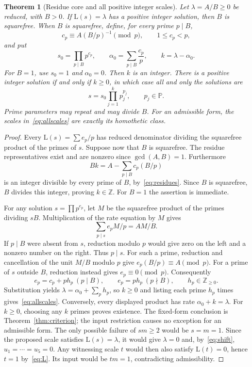 \documentclass[11pt,a4paper]{article}
\newcommand{\PP}{\mathbb{P}}
\newcommand{\Lrate}{\mathrm{L}}
\newtheorem{theorem}{Theorem}[section]
\theoremstyle{definition}
\theoremstyle{remark}
\begin{document}
\begin{theorem}[Residue core and all positive integer scales]\label{thm:residue}
Let $\lambda=A/B\ge0$ be reduced, with $B>0$. If $\Lrate(s)=\lambda$
has a positive integer solution, then $B$ is squarefree. When $B$ is
squarefree, define, for every prime $p\mid B$,
\begin{equation}\label{eq:residues}
 c_p\equiv A(B/p)^{-1}\pmod p,\qquad 1\le c_p<p,
\end{equation}
and put
\begin{equation}\label{eq:core}
 s_0=\prod_{p\mid B}p^{c_p},\qquad
 \alpha_0=\sum_{p\mid B}\frac{c_p}{p},\qquad
 k=\lambda-\alpha_0.
\end{equation}
For $B=1$, use $s_0=1$ and $\alpha_0=0$. Then $k$ is an integer.
There is a positive integer solution if and only if $k\ge0$, in which
case all and only the solutions are
\begin{equation}\label{eq:allscales}
 s=s_0\prod_{j=1}^{k}p_j^{p_j},\qquad p_j\in\PP.
\end{equation}
Prime parameters may repeat and may divide $B$. For an admissible form,
the scales in~\eqref{eq:allscales} are exactly its homothetic class.
\end{theorem}
\begin{proof}
Every $\Lrate(s)=\sum e_p/p$ has reduced denominator dividing the
squarefree product of the primes of $s$. Suppose now that $B$ is
squarefree. The residue representatives exist and are nonzero since
$\gcd(A,B)=1$. Furthermore
\[
 Bk=A-\sum_{p\mid B}c_p(B/p)
\]
is an integer divisible by every prime of $B$, by~\eqref{eq:residues}.
Since $B$ is squarefree, $B$ divides this integer, proving $k\in\mathbb Z$.
For $B=1$ the assertion is immediate.

For any solution $s=\prod p^{e_p}$, let $M$ be the squarefree product of
the primes dividing $sB$. Multiplication of the rate equation by $M$ gives
\begin{equation}\label{eq:modscale}
 \sum_{p\mid s}e_p M/p=A M/B.
\end{equation}
If $p\mid B$ were absent from $s$, reduction modulo $p$ would give zero
on the left and a nonzero number on the right. Thus $p\mid s$. For such
a prime, reduction and cancellation of the unit $M/B$ modulo $p$ give
$e_p(B/p)\equiv A\pmod p$. For a prime of $s$ outside $B$, reduction
instead gives $e_p\equiv0\pmod p$. Consequently
\[
 e_p=c_p+ph_p\ (p\mid B),\qquad
 e_p=ph_p\ (p\nmid B),\qquad h_p\in\mathbb Z_{\ge0}.
\]
Substitution yields $\lambda=\alpha_0+\sum_p h_p$, so $k\ge0$ and
listing each prime $h_p$ times gives~\eqref{eq:allscales}. Conversely,
every displayed product has rate $\alpha_0+k=\lambda$. For $k\ge0$,
choosing any $k$ primes proves existence. The fixed-form conclusion is
Theorem~\ref{thm:criterion}; the input restriction causes no exception for
an admissible form. The only possible failure of $sm\ge2$ would be $s=m=1$.
Since the proposed scale satisfies $\Lrate(s)=\lambda$, it would give
$\lambda=0$ and, by~\eqref{eq:shift}, $u_1=\cdots=u_5=0$.
Any witnessing scale $t$ would then also satisfy $\Lrate(t)=0$, hence
$t=1$ by~\eqref{eq:L}. Its input would be $tm=1$, contradicting
admissibility.
\end{proof}
\end{document}
